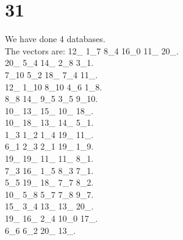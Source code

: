\chapter{31}
\indent We have done 4 databases.\\
The vectors are:
12\_ 1\_7 8\_4 16\_0 11\_ 20\_.\\20\_ 5\_4 14\_ 2\_8 3\_1.\\7\_10 5\_2 18\_ 7\_4 11\_.\\12\_ 1\_10 8\_10 4\_6 1\_8.\\8\_8 14\_ 9\_5 3\_5 9\_10.\\10\_ 13\_ 15\_ 10\_ 18\_.\\10\_ 18\_ 13\_ 14\_ 5\_1.\\1\_3 1\_2 1\_4 19\_ 11\_.\\6\_1 2\_3 2\_1 19\_ 1\_9.\\19\_ 19\_ 11\_ 11\_ 8\_1.\\7\_3 16\_ 1\_5 8\_3 7\_1.\\5\_5 19\_ 18\_ 7\_7 8\_2.\\10\_ 5\_8 5\_7 7\_8 9\_7.\\15\_ 3\_4 13\_ 13\_ 20\_.\\19\_ 16\_ 2\_4 10\_0 17\_.\\6\_6 6\_2 20\_ 13\_.\\